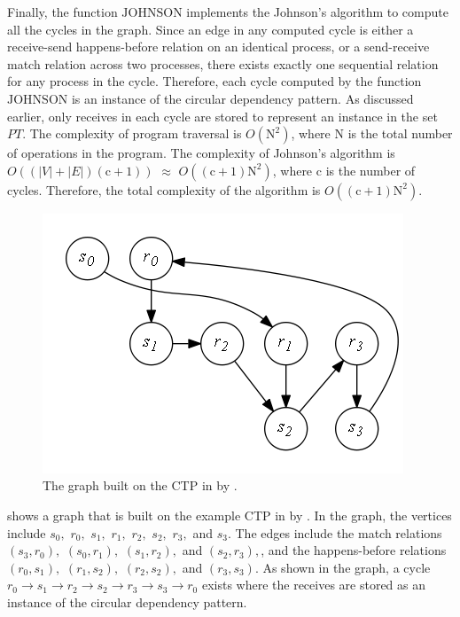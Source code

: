 Finally, the function $\mathrm{JOHNSON}$ implements the Johnson's algorithm to compute all the cycles in the graph. Since an edge in any computed cycle is either a receive-send happens-before relation on an identical process, or a send-receive match relation across two processes, there exists exactly one sequential relation for any process in the cycle. Therefore, each cycle computed by the function $\mathrm{JOHNSON}$ is an instance of the circular dependency pattern. As discussed earlier, only receives in each cycle are stored to represent an instance in the set $\mathit{PT}$. The complexity of program traversal is $O(\mathrm{N}^2)$, where $\mathrm{N}$ is the total number of operations in the program. The complexity of Johnson's algorithm is $O((|V|+|E|)(\mathrm{c}+1))$ $\approx$ $O((\mathrm{c}+1)\mathrm{N}^2)$, where $\mathrm{c}$ is the number of cycles. Therefore, the total complexity of the algorithm is $O((\mathrm{c}+1)\mathrm{N}^2)$.

\begin{figure}[h]
\centering
\includegraphics[scale=0.45]{fig/circulardependencyGraph1.png}
\caption{The graph built on the CTP in  by .}
\label{fig:circulargraph}
\end{figure}

 shows a graph that is built on the example CTP in  by . 
In the graph, the vertices include $s_0,$ $r_0,$ $s_1,$ $r_1,$ $r_2,$ $s_2,$ $r_3,$ and $s_3$. The edges include the match relations $(s_3,r_0),$ $(s_0,r_1),$ $(s_1,r_2),$ and $(s_2,r_3),$, and the happens-before relations $(r_0,s_1),$ $(r_1,s_2),$ $(r_2,s_2),$ and $(r_3,s_3)$. 
As shown in the graph, a cycle $r_0\rightarrow s_1\rightarrow r_2\rightarrow s_2\rightarrow r_3\rightarrow s_3\rightarrow r_0$ exists where the receives are stored as an instance of the circular dependency pattern.

